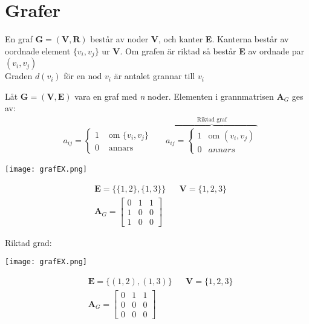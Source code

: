 \section{Grafer} %
\label{sec:grafer}
\begin{Def}
	En graf $\mathbf{G} = (\mathbf{V}, \mathbf{R})$ består av noder \textbf{V}, och kanter \textbf{E}. Kanterna består av oordnade element $\{v_i, v_j\}$ ur \textbf{V}. Om grafen är riktad så består \textbf{E} av ordnade par $(v_i, v_j)$\\
	Graden $d(v_i)$ för en nod $v_i$ är antalet grannar till $v_i$
\end{Def}
\begin{Def}
	Låt $\mathbf{G} = (\mathbf{V}, \mathbf{E})$ vara en graf med \textit{n} noder. Elementen i grannmatrisen $\mathbf{A}_{G}$ ges av:
	\begin{align*}
	&a_{ij} = 
	\begin{cases}
		1 &\mbox{ om } \{v_i, v_j\} \\
		0 &\mbox{ annars}
	\end{cases}
	&& \overbrace{a_{ij} = 
	\begin{cases}
		1 &\mbox{om } (v_i, v_j)\\
		0 &annars
	\end{cases}}^\text{Riktad graf}
	\end{align*}
\end{Def}
\begin{Ex}
	\begin{center}
		\texttt{[image: grafEX.png]}
	\end{center}
	\begin{align*}
		&\mathbf{E} = \{ \{1,2\}, \{1,3\}\}
		&& \mathbf{V} = \{1,2,3\}\\
		&\mathbf{A}_G = 
		\begin{bmatrix}
			0 & 1 & 1\\
			1 & 0 & 0\\
			1 & 0 & 0
		\end{bmatrix}
	\end{align*}
\end{Ex}
\begin{Ex}
	Riktad grad:
	\begin{center}
		\texttt{[image: grafEX.png]}
	\end{center}
	\begin{align*}
		&\mathbf{E} = \{(1,2), (1,3)\}
		&&\mathbf{V} = \{1,2,3\}\\
		&\mathbf{A}_G = 
		\begin{bmatrix}
			0 & 1 & 1\\
			0 & 0 & 0\\
			0 & 0 & 0
		\end{bmatrix}
	\end{align*}
\end{Ex}
